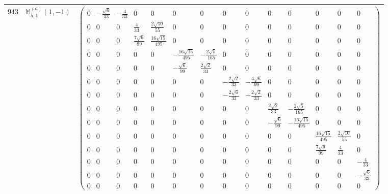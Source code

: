 \documentclass[fleqn,8pt,landscape]{jsarticle}
\begin{document}
\begin{center}
\begin{longtable}{ccc}
$ 943 $ & $ \mathbb{M}_{5,1}^{(a)}(1,-1) $ & $ \begin{pmatrix} 0 & - \frac{\sqrt{6}}{33} & - \frac{4}{33} & 0 & 0 & 0 & 0 & 0 & 0 & 0 & 0 & 0 & 0 & 0 \\ 0 & 0 & 0 & \frac{4}{33} & \frac{2 \sqrt{10}}{55} & 0 & 0 & 0 & 0 & 0 & 0 & 0 & 0 & 0 \\ 0 & 0 & 0 & \frac{7 \sqrt{6}}{99} & \frac{16 \sqrt{15}}{495} & 0 & 0 & 0 & 0 & 0 & 0 & 0 & 0 & 0 \\ 0 & 0 & 0 & 0 & 0 & - \frac{16 \sqrt{15}}{495} & - \frac{2 \sqrt{5}}{165} & 0 & 0 & 0 & 0 & 0 & 0 & 0 \\ 0 & 0 & 0 & 0 & 0 & - \frac{\sqrt{6}}{99} & \frac{2 \sqrt{2}}{33} & 0 & 0 & 0 & 0 & 0 & 0 & 0 \\ 0 & 0 & 0 & 0 & 0 & 0 & 0 & - \frac{2 \sqrt{2}}{33} & - \frac{4 \sqrt{6}}{99} & 0 & 0 & 0 & 0 & 0 \\ 0 & 0 & 0 & 0 & 0 & 0 & 0 & - \frac{2 \sqrt{6}}{33} & - \frac{2 \sqrt{2}}{33} & 0 & 0 & 0 & 0 & 0 \\ 0 & 0 & 0 & 0 & 0 & 0 & 0 & 0 & 0 & \frac{2 \sqrt{2}}{33} & - \frac{2 \sqrt{5}}{165} & 0 & 0 & 0 \\ 0 & 0 & 0 & 0 & 0 & 0 & 0 & 0 & 0 & - \frac{\sqrt{6}}{99} & - \frac{16 \sqrt{15}}{495} & 0 & 0 & 0 \\ 0 & 0 & 0 & 0 & 0 & 0 & 0 & 0 & 0 & 0 & 0 & \frac{16 \sqrt{15}}{495} & \frac{2 \sqrt{10}}{55} & 0 \\ 0 & 0 & 0 & 0 & 0 & 0 & 0 & 0 & 0 & 0 & 0 & \frac{7 \sqrt{6}}{99} & \frac{4}{33} & 0 \\ 0 & 0 & 0 & 0 & 0 & 0 & 0 & 0 & 0 & 0 & 0 & 0 & 0 & - \frac{4}{33} \\ 0 & 0 & 0 & 0 & 0 & 0 & 0 & 0 & 0 & 0 & 0 & 0 & 0 & - \frac{\sqrt{6}}{33} \\ 0 & 0 & 0 & 0 & 0 & 0 & 0 & 0 & 0 & 0 & 0 & 0 & 0 & 0 \end{pmatrix} $ \\ \hline

\end{longtable}
\end{center}
\end{document}
